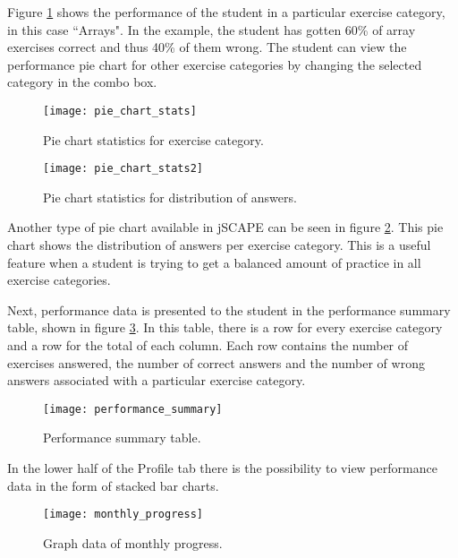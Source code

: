Figure \ref{fig:pie_chart_stats1} shows the performance of the student in a particular exercise category, in this case ``Arrays". In the example, the student has gotten 60\% of array exercises correct and thus 40\% of them wrong. The student can view the performance pie chart for other exercise categories by changing the selected category in the combo box.

\begin{figure}[H]
\centering
\texttt{[image: pie\_chart\_stats]}
\caption{Pie chart statistics for exercise category.}
\label{fig:pie_chart_stats1}
\end{figure}

\begin{figure}[H]
\centering
\texttt{[image: pie\_chart\_stats2]}
\caption{Pie chart statistics for distribution of answers.}
\label{fig:pie_chart_stats2}
\end{figure}

Another type of pie chart available in jSCAPE can be seen in figure \ref{fig:pie_chart_stats2}. This pie chart shows the distribution of answers per exercise category. This is a useful feature when a student is trying to get a balanced amount of practice in all exercise categories. \newline

Next, performance data is presented to the student in the performance summary table, shown in figure \ref{fig:performance_summary}. In this table, there is a row for every exercise category and a row for the total of each column. Each row contains the number of exercises answered, the number of correct answers and the number of wrong answers associated with a particular exercise category.

\begin{figure}[H]
\centering
\texttt{[image: performance\_summary]}
\caption{Performance summary table.}
\label{fig:performance_summary}
\end{figure}

In the lower half of the Profile tab there is the possibility to view performance data in the form of stacked bar charts.

\begin{figure}[H]
\centering
\texttt{[image: monthly\_progress]}
\caption{Graph data of monthly progress.}
\label{fig:monthly_progress}
\end{figure}

